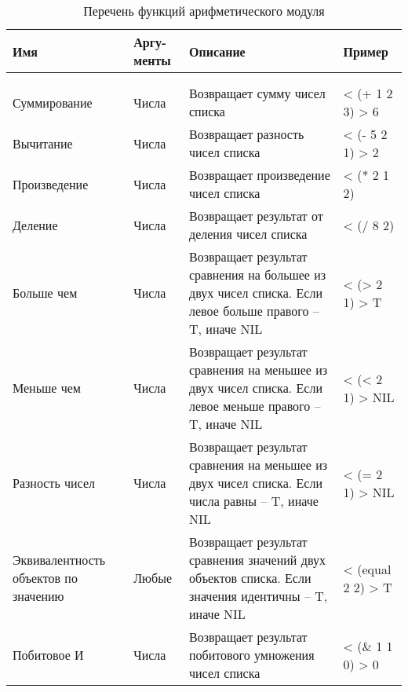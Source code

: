 \begin{xltabular}{\textwidth}{|p{3.6cm}|p{2cm}|p{6cm}|X|}
	\caption{Перечень функций арифметического модуля\label{funcprimarith:table}}\\ \hline
	\centrow Имя & \centrow Аргу- \linebreak менты & \centrow Описание & \centrow Пример \\ \hline
	 &  &  &  \\ \hline
	\endfirsthead
	 &  &  &  \\ \hline
	\finishhead
	Суммирование & Числа & Возвращает сумму чисел списка & < (+ 1 2 3) \linebreak > 6 \\ \hline 
	Вычитание & Числа & Возвращает разность чисел списка & < (- 5 2 1) \linebreak > 2 \\ \hline 
	Произведение & Числа & Возвращает произведение чисел списка & < (* 2 1 2)  \\ \hline 
	Деление & Числа & Возвращает результат от деления чисел списка & < (/ 8 2)  \\ \hline 
	Больше чем & Числа & Возвращает результат сравнения на большее из двух чисел списка. Если левое больше правого -- T, иначе NIL & < (> 2 1) \linebreak > T \\ \hline 
	Меньше чем & Числа & Возвращает результат сравнения на меньшее из двух чисел списка. Если левое меньше правого -- T, иначе NIL & < (< 2 1) \linebreak > NIL \\ \hline 
	Разность чисел & Числа & Возвращает результат сравнения на меньшее из двух чисел списка. Если числа равны -- T, иначе NIL & < (= 2 1) \linebreak > NIL \\ \hline 
	Эквивалентность объектов по значению & Любые & Возвращает результат сравнения значений двух объектов списка. Если значения идентичны -- T, иначе NIL & < (equal 2 2) \linebreak > T \\ \hline 
	Побитовое И & Числа & Возвращает результат побитового умножения чисел списка & < (\& 1 1 0) \linebreak > 0 \\ \hline 

\end{xltabular}
